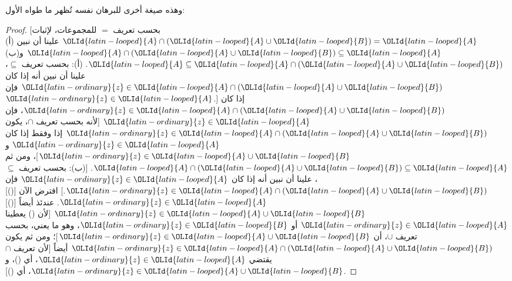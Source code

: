 \documentclass[../../../include/open-logic-section]{subfiles}
\begin{document}
وهذه صيغة أخرى للبرهان نفسه تُظهر ما طواه الأول:
\begin{proof}{}
[بحسب تعريف $=$ للمجموعات، لإثبات ${\OLId{latin-looped}{A}} \cap ({\OLId{latin-looped}{A}} \cup {\OLId{latin-looped}{B}}) = {\OLId{latin-looped}{A}}$ علينا أن
  نبين (أ) ${\OLId{latin-looped}{A}} \cap ({\OLId{latin-looped}{A}} \cup {\OLId{latin-looped}{B}}) \subseteq {\OLId{latin-looped}{A}}$ و(ب)
  ${\OLId{latin-looped}{A}} \subseteq {\OLId{latin-looped}{A}} \cap ({\OLId{latin-looped}{A}} \cup {\OLId{latin-looped}{B}})$. (أ): بحسب تعريف $\subseteq$، علينا
  أن نبين أنه إذا كان ${\OLId{latin-ordinary}{z}} \in {\OLId{latin-looped}{A}} \cap ({\OLId{latin-looped}{A}} \cup {\OLId{latin-looped}{B}})$ فإن ${\OLId{latin-ordinary}{z}} \in {\OLId{latin-looped}{A}}$.]
إذا كان ${\OLId{latin-ordinary}{z}} \in {\OLId{latin-looped}{A}} \cap ({\OLId{latin-looped}{A}} \cup {\OLId{latin-looped}{B}})$، فإن ${\OLId{latin-ordinary}{z}} \in {\OLId{latin-looped}{A}}$ [لأنه بحسب تعريف
$\cap$، يكون ${\OLId{latin-ordinary}{z}} \in {\OLId{latin-looped}{A}} \cap ({\OLId{latin-looped}{A}} \cup {\OLId{latin-looped}{B}})$ إذا وفقط إذا كان ${\OLId{latin-ordinary}{z}} \in {\OLId{latin-looped}{A}}$
و${\OLId{latin-ordinary}{z}} \in {\OLId{latin-looped}{A}} \cup {\OLId{latin-looped}{B}}$]، ومن ثم ${\OLId{latin-looped}{A}} \cap ({\OLId{latin-looped}{A}} \cup {\OLId{latin-looped}{B}}) \subseteq {\OLId{latin-looped}{A}}$.
[(ب): بحسب تعريف $\subseteq$، علينا أن نبين أنه إذا كان ${\OLId{latin-ordinary}{z}} \in {\OLId{latin-looped}{A}}$ فإن
${\OLId{latin-ordinary}{z}} \in {\OLId{latin-looped}{A}} \cap ({\OLId{latin-looped}{A}} \cup {\OLId{latin-looped}{B}})$.] افترض الآن [()] ${\OLId{latin-ordinary}{z}} \in {\OLId{latin-looped}{A}}$. عندئذ أيضاً
[()] ${\OLId{latin-ordinary}{z}} \in {\OLId{latin-looped}{A}} \cup {\OLId{latin-looped}{B}}$ [لأن () يعطينا ${\OLId{latin-ordinary}{z}} \in {\OLId{latin-looped}{A}}$ أو ${\OLId{latin-ordinary}{z}} \in {\OLId{latin-looped}{B}}$،
وهو ما يعني، بحسب تعريف $\cup$، أن ${\OLId{latin-ordinary}{z}} \in {\OLId{latin-looped}{A}} \cup {\OLId{latin-looped}{B}}$]؛ ومن ثم يكون
${\OLId{latin-ordinary}{z}} \in {\OLId{latin-looped}{A}} \cap ({\OLId{latin-looped}{A}} \cup {\OLId{latin-looped}{B}})$ أيضاً [لأن تعريف $\cap$ يقتضي
${\OLId{latin-ordinary}{z}} \in {\OLId{latin-looped}{A}}$، أي ()، و${\OLId{latin-ordinary}{z}} \in {\OLId{latin-looped}{A}} \cup {\OLId{latin-looped}{B}}$، أي ()].
\end{proof}
\end{document}
